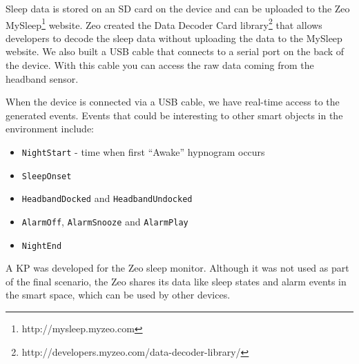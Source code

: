 Sleep data is stored on an SD card on the device and can be uploaded to the Zeo MySleep\footnote{http://mysleep.myzeo.com} website. Zeo created the Data Decoder Card library\footnote{http://developers.myzeo.com/data-decoder-library/} that allows developers to decode the sleep data without uploading the data to the MySleep website. We also built a USB cable that connects to a serial port on the back of the device. With this cable you can access the raw data coming from the headband sensor. %


When the device is connected via a USB cable, we have real-time access to the generated events. Events that could be interesting to other smart objects in the environment include:

\begin{itemize}
	\item \texttt{NightStart} - time when first ``Awake'' hypnogram occurs
	\item \texttt{SleepOnset}
	\item \texttt{HeadbandDocked} and \texttt{HeadbandUndocked}
	\item \texttt{AlarmOff}, \texttt{AlarmSnooze} and \texttt{AlarmPlay}
	\item \texttt{NightEnd}
\end{itemize}

% 
% 
% 
% 
% 
A \ac{KP} was developed for the Zeo sleep monitor. Although it was not used as part of the final scenario, the Zeo shares its data like sleep states and alarm events in the smart space, which can be used by other devices.
 





